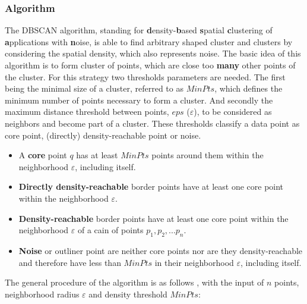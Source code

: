 \documentclass[a4paper,12pt]{report}
\begin{document}
\subsubsection{Algorithm}

The DBSCAN algorithm, standing for \textbf{d}ensity-\textbf{b}ased \textbf{s}patial \textbf{c}lustering of \textbf{a}pplications with \textbf{n}oise, is able to find arbitrary shaped cluster and clusters by considering the spatial density, which also represents noise. The basic idea of this algorithm is to form cluster of points, which are close too \textbf{many} other points of the cluster. For this strategy two thresholds parameters are needed. The first being the minimal size of a cluster, referred to as $MinPts$, which defines the minimum number of points necessary to form a cluster. And secondly the maximum distance threshold between points, $eps$ ($\varepsilon$), to be considered as neighbors and become part of a cluster. These thresholds classify a data point as core point, (directly) density-reachable point or noise. \cite{Yildirim2020,Chauhan2020,Padro2017}

\begin{itemize}
	\item A \textbf{core} point $q$ has at least $MinPts$ points around them within the neighborhood $\varepsilon$, including itself.
    \item \textbf{Directly density-reachable} border points have at least one core point within the neighborhood $\varepsilon$.
     \item \textbf{Density-reachable} border points have at least one core point within the neighborhood $\varepsilon$ of a cain of points $p_1,p_2,...p_n$.
 	\item \textbf{Noise} or outliner point are neither core points nor are they density-reachable and therefore have less than $MinPts$ in their neighborhood $\varepsilon$, including itself.
\end{itemize}

The general procedure of the algorithm is as follows \cite{Zhao2018}, with the input of $n$ points, neighborhood radius $\varepsilon$ and density threshold $MinPts$:
\end{document}

